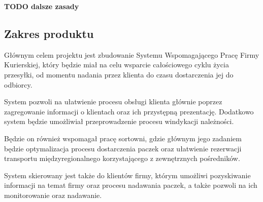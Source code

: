 \textbf{TODO dalsze zasady}

\subsection{Zakres produktu}
Głównym celem projektu jest zbudowanie Systemu Wspomagającego Pracę Firmy Kurierskiej, który będzie miał na celu wsparcie całościowego cyklu życia przesyłki, od momentu nadania przez klienta do czasu dostarczenia jej do odbiorcy. 

System pozwoli na ułatwienie procesu obsługi klienta głównie poprzez zagregowanie informacji o klientach oraz ich przystępną prezentację. Dodatkowo system będzie umożliwiał przeprowadzenie procesu windykacji należności.

Będzie on również wspomagał pracę sortowni, gdzie głównym jego zadaniem będzie optymalizacja procesu dostarczenia paczek oraz ułatwienie rezerwacji transportu międzyregionalnego korzystającego z zewnętrznych pośredników.

System skierowany jest także do klientów firmy, którym umożliwi pozyskiwanie informacji na temat firmy oraz procesu nadawania paczek, a także pozwoli na ich monitorowanie oraz nadawanie.

%



